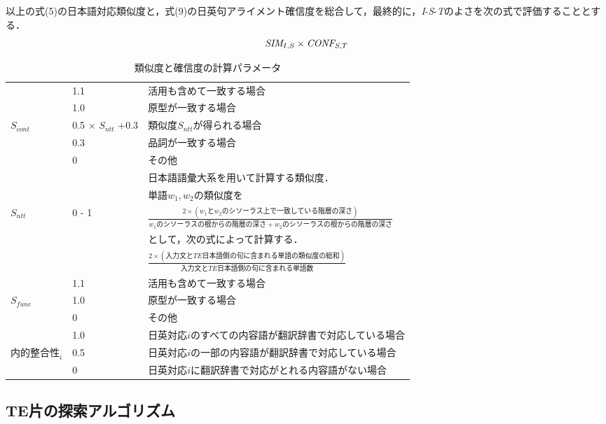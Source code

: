 \documentclass{nlp}
\begin{document}
\vspace{10mm}

以上の式(5)の日本語対応類似度と，式(9)の日英句アライメント確信度を総合して，最終的に，{\it I}-{\it S}-{\it T}のよさを次の式で評価することとする．
\begin{equation}
\mbox{{\it SIM}}_{I,S} \times \mbox{{\it CONF}}_{S,T}
\end{equation}

\begin{table*}
\begin{center}
\caption{類似度と確信度の計算パラメータ}
\label{variable}
\begin{tabular}{lll}
\hline
		&	1.1 		& 活用も含めて一致する場合 	\\
		&	1.0 		& 原型が一致する場合		\\
$S_{cont}$	&	0.5 $\times$ $S_{ntt}$ +0.3 & 類似度$S_{ntt}$が得られる場合	\\
		&	0.3		& 品詞が一致する場合		\\
		&	0		& その他		\\
\hline
		&		& 日本語語彙大系\cite{NTT}を用いて計算する類似度．\\
		&		& 単語$w_1, w_2$の類似度を\\
$S_{ntt}$	& 	0 - 1	& $\frac{2 \times (w_1とw_2のシソーラス上で一致している階層の深さ)}{w_1のシソーラスの根からの階層の深さ + w_2のシソーラスの根からの階層の深さ}$ \\
		& 		& として，次の式によって計算する．\\
		&		&$\frac{2 \times (入力文とTE日本語側の句に含まれる単語の類似度の総和)}{入力文とTE日本語側の句に含まれる単語数}$ \\
\hline
		&	1.1 	& 活用も含めて一致する場合 	\\
$S_{func}$	&	1.0 	& 原型が一致する場合		\\
		&	0	& その他		\\
\hline
		&	1.0 	& 日英対応$i$のすべての内容語が翻訳辞書で対応している場合	\\
$内的整合性_i$	&	0.5 	& 日英対応$i$の一部の内容語が翻訳辞書で対応している場合	\\
		&	0	& 日英対応$i$に翻訳辞書で対応がとれる内容語がない場合	\\
\hline
\end{tabular}
\end{center}
\end{table*}

\subsection{TE片の探索アルゴリズム}
\end{document}
